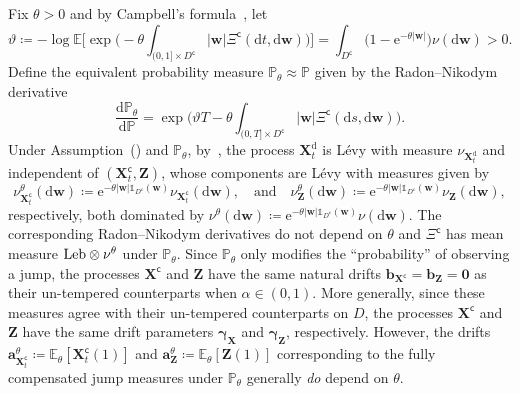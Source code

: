 \documentclass[en,oneside,bbfont,article]{amsart}
\theoremstyle{remark}
\theoremstyle{definition}
\theoremstyle{definition}
\newcommand\E{\mathds{E}}
\newcommand\e{\mathord{\mathrm{e}}}
\newcommand\p{\mathds{P}}
\newcommand\1{\mathds{1}}
\newcommand{\Leb}{\text{\normalfont Leb}}
\newcommand\co{\mathsf{c}}
\newcommand{\D}{\mathrm{d}}
\begin{document}
Fix $\theta>0$ and by Campbell's formula~\cite[p.~28]{MR1207584}, let
\begin{equation}\label{eq:vartheta_defn}
\vartheta
\coloneqq-\log\E\bigg[\exp\bigg(\!-\theta\int_{(0,1]\times D^\co}|\bm{w}|\Xi^\co(\D t,\D\bm{w})\bigg)\bigg]
=\int_{D^\co}\big(1-\e^{-\theta|\bm{w}|}\big)\nu(\D\bm{w})>0.
\end{equation}
Define the equivalent probability measure $\p_\theta\approx \p$ given by the Radon--Nikodym derivative
\begin{equation}
\label{eq:P_theta^t}  
\frac{\D\p_\theta}{\D\p}=\exp\bigg(\vartheta T-\theta\int_{(0,T]\times D^\co}|\bm{w}|\Xi^\co(\D s,\D\bm{w})\bigg).
\end{equation}
Under Assumption~() and $\p_\theta$, by~\cite[Thm~33.1]{MR3185174}, the process $\bm{X}^\D_t$ is L\'evy with measure $\nu_{\bm{X}_t^\D}$ and independent of $(\bm{X}^\co_t,\bm{Z})$, whose components are L\'evy with measures given by 
\[
\nu_{\bm{X}_t^\co}^\theta(\D\bm{w})
\coloneqq \e^{-\theta|\bm{w}|\1_{D^\co}(\bm{w})}\nu_{\bm{X}_t^\co}(\D\bm{w}),
\quad\text{and}\quad
\nu_{\bm{Z}}^\theta(\D\bm{w})
\coloneqq\e^{-\theta|\bm{w}|\1_{D^\co}(\bm{w})}\nu_{\bm{Z}}(\D\bm{w}),
\]
respectively, both dominated by $\nu^\theta(\D\bm{w})\coloneqq \e^{-\theta|\bm{w}|\1_{D^\co}(\bm{w})}\nu(\D\bm{w})$. The corresponding Radon--Nikodym derivatives do not depend on $\theta$ and $\Xi^\co$ has mean measure $\Leb\otimes\nu^\theta$ under $\p_\theta$. Since $\p_\theta$ only modifies the ``probability'' of observing a jump, the processes $\bm{X}^\co$ and $\bm{Z}$ have the same natural drifts $\bm{b}_{\bm{X}^\co}=\bm{b}_{\bm{Z}}=\bm{0}$ as their un-tempered counterparts when $\alpha\in(0,1)$. More generally, since these measures agree with their un-tempered counterparts on $D$, the processes $\bm{X}^\co$ and $\bm{Z}$ have the same drift parameters $\bm{\gamma}_{\bm{X}}$ and $\bm{\gamma}_{\bm{Z}}$, respectively. However, the drifts $\bm{a}_{\bm{X}_t^\co}^\theta\coloneqq\E_\theta[\bm{X}_t^\co(1)]$ and $\bm{a}_{\bm{Z}}^\theta\coloneqq\E_\theta[\bm{Z}(1)]$ corresponding to the fully compensated jump measures under $\p_\theta$ generally \emph{do} depend on $\theta$.
\end{document}
